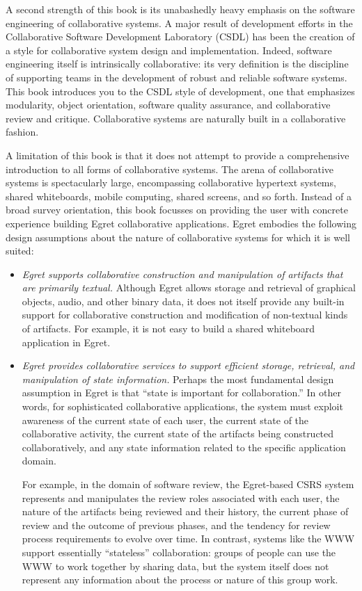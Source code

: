 A second strength of this book is its unabashedly heavy emphasis on the
software engineering of collaborative systems.  A major result of
development efforts in the Collaborative Software Development Laboratory
(CSDL) has been the creation of a style for collaborative system design and
implementation. Indeed, software engineering itself is intrinsically
collaborative: its very definition is the discipline of supporting teams in
the development of robust and reliable software systems.  This book
introduces you to the CSDL style of development, one that emphasizes
modularity, object orientation, software quality assurance, and
collaborative review and critique.  Collaborative systems are naturally
built in a collaborative fashion.

A limitation of this book is that it does not attempt to provide a
comprehensive introduction to all forms of collaborative systems.  The
arena of collaborative systems is spectacularly large, encompassing
collaborative hypertext systems, shared whiteboards, mobile computing,
shared screens, and so forth.  Instead of a broad survey orientation, this
book focusses on providing the user with concrete experience building Egret
collaborative applications.  Egret embodies the following design
assumptions about the nature of collaborative systems for which it is well
suited:

\begin{itemize}
\item {\em Egret supports collaborative construction and manipulation of
  artifacts that are primarily textual.}  Although Egret allows storage
  and retrieval of graphical objects, audio, and other binary data, it
  does not itself provide any built-in support for collaborative
  construction and modification of non-textual kinds of artifacts.  For
  example, it is not easy to build a shared whiteboard application in
  Egret.

\item {\em Egret provides collaborative services to support
  efficient storage, retrieval, and manipulation of state information.}
  Perhaps the most fundamental design assumption in Egret is that ``state
  is important for collaboration.''  In other words, for
  sophisticated collaborative applications, the system must exploit
  awareness of the current state of each user, the current state of the
  collaborative activity, the current state of the artifacts being
  constructed collaboratively, and any state information related to the
  specific application domain.  

  For example, in the domain of software review, the Egret-based CSRS
  system represents and manipulates the review roles associated with each
  user, the nature of the artifacts being reviewed and their history, the
  current phase of review and the outcome of previous phases, and the
  tendency for review process requirements to evolve over time.  In
  contrast, systems like the WWW support essentially ``stateless''
  collaboration: groups of people can use the WWW to work together by
  sharing data, but the system itself does not represent any information
  about the process or nature of this group work.

\end{itemize}


